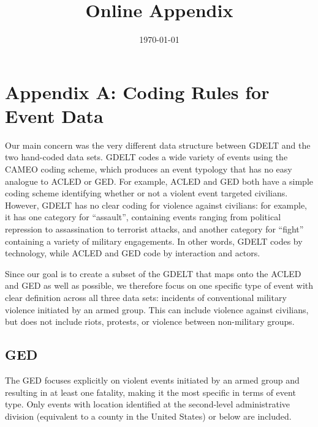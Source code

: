 \documentclass[hidelinks]{article}
\begin{document}
\title{Online Appendix}
\date{\today}
\maketitle
\vfill
\pagebreak

\doublespacing 

\section*{Appendix A: Coding Rules for Event Data}
Our main concern was the very different data structure between GDELT and the two hand-coded data sets. GDELT codes a wide variety of events using the CAMEO coding scheme, which produces an event typology that has no easy analogue to ACLED or GED. For example, ACLED and GED both have a simple coding scheme identifying whether or not a violent event targeted civilians. However, GDELT has no clear coding for violence against civilians: for example, it has one category for ``assault'', containing events ranging from political repression to assassination to terrorist attacks, and another category for ``fight'' containing a variety of military engagements. In other words, GDELT codes by technology, while ACLED and GED code by interaction and actors.

Since our goal is to create a subset of the GDELT that maps onto the ACLED and GED as well as possible, we therefore focus on one specific type of event with clear definition across all three data sets: incidents of conventional military violence initiated by an armed group. This can include violence against civilians, but does not include riots, protests, or violence between non-military groups.

\subsection{GED}
The GED focuses explicitly on violent events initiated by an armed group and resulting in at least one fatality, making it the most specific in terms of event type. Only events with location identified at the second-level administrative division (equivalent to a county in the United States) or below are included.
\end{document}
